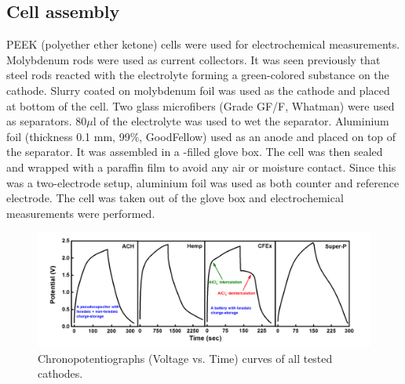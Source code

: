\subsection{Cell assembly}
PEEK (polyether ether ketone) cells were used for electrochemical measurements. Molybdenum rods were used as current collectors. It was seen previously that steel rods reacted with the electrolyte forming a green-colored substance on the cathode. Slurry coated on molybdenum foil was used as the cathode and placed at bottom of the cell. Two glass microfibers (Grade GF/F, Whatman) were used as separators. 80$\mu$l of the electrolyte was used to wet the separator. Aluminium foil (thickness 0.1 mm, 99$\%$, GoodFellow) used as an anode and placed on top of the separator. It was assembled in a -filled glove box. The cell was then sealed and wrapped with a paraffin film to avoid any air or moisture contact. Since this was a two-electrode setup, aluminium foil was used as both counter and reference electrode. The cell was taken out of the glove box and electrochemical measurements were performed. 
\begin{figure}[tbh!]
  \centering
  \includegraphics[width=\textwidth]{Figures/chap5fig/gcdall}
    \caption{Chronopotentiographs (Voltage vs. Time) curves of all tested cathodes.}
  \label{Figures/chap5fig:gcdall}
\end{figure}

